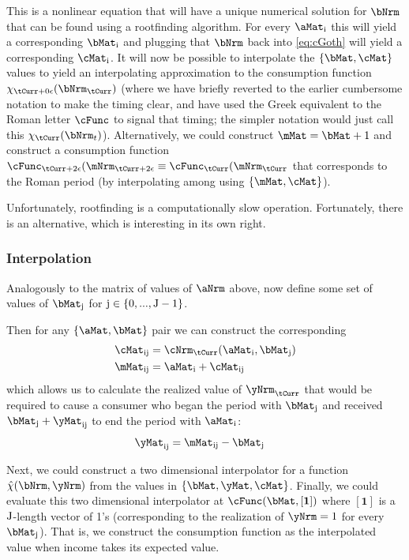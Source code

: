 \documentclass[./SolvingMicroDSOPs]{subfiles}
\begin{document}
{This is a nonlinear equation that will have a unique numerical solution for $\bNrm$ that can be found using a rootfinding algorithm.  For every $\aMat_{\aIdx}$ this will yield a corresponding $\bMat_{\aIdx}$ and plugging that $\bNrm$ back into \eqref{eq:cGoth} will yield a corresponding $\cMat_{\aIdx}$.  It will now be possible to interpolate the $\{\bMat,\cMat\}$ values to yield an interpolating approximation to the consumption function $\chi_{\tCurr+\beginWithb}(\bNrm_{\tCurr})$ (where we have briefly reverted to the earlier cumbersome notation to make the timing clear, and have used the Greek equivalent to the Roman letter $\cFunc$ to signal that timing; the simpler notation would just call this $\chi_{\tCurr}(\bNrm_{t})$).  Alternatively, we could construct $\mMat = \bMat + 1$ and construct a consumption function $\cFunc_{\tCurr+\calculatem}(\mNrm_{\tCurr+\calculatem} \equiv \cFunc_{\tCurr}(\mNrm_{\tCurr}$ that corresponds to the Roman period (by interpolating among using $\{\mMat,\cMat\}$).

Unfortunately, rootfinding is a computationally slow operation.  Fortunately, there is an alternative, which is interesting in its own right.  

\subsubsection{Interpolation}

Analogously to the matrix of values of $\aNrm$ above, now define some set of values of $\bMat_{\bIdx}$ for $\mathrm{j} \in \{0,...,\mathrm{J}-1\}$.

Then for any $\{\aMat,\bMat\}$ pair we can construct the corresponding
\begin{align}
  \cMat_{\aIdx\bIdx} & = \mathfrak{\cNrm}_{\tCurr}(\aMat_{\aIdx},\bMat_{\bIdx})
\\ \mMat_{\aIdx\bIdx} & = \aMat_{\aIdx}+\cMat_{\aIdx\bIdx}                       
\end{align}
which allows us to calculate the realized value of $\yNrm_{\tCurr}$ that would be required to cause a consumer who began the period with $\bMat_{\bIdx}$ and received $\bMat_{\bIdx}+\yMat_{\aIdx\bIdx}$ to end the period with $\aMat_{\aIdx}$:
\begin{align}
  \yMat_{\aIdx\bIdx} & = \mMat_{\aIdx\bIdx}-\bMat_{\bIdx}
\end{align}

Next, we could construct a two dimensional interpolator for a function $\hat{\chi}(\bNrm,\yNrm)$ from the values in $\{\bMat,\yMat,\cMat\}$.  Finally, we could evaluate this two dimensional interpolator at $\cFunc(\bMat,[\mathbf{1}])$ where $[\mathbf{1}]$ is a $\mathrm{J}$-length vector of 1's (corresponding to the realization of $\yNrm=1$ for every $\bMat_{\bIdx}$).  That is, we construct the consumption function as the interpolated value when income takes its expected value.

}
\end{document}
